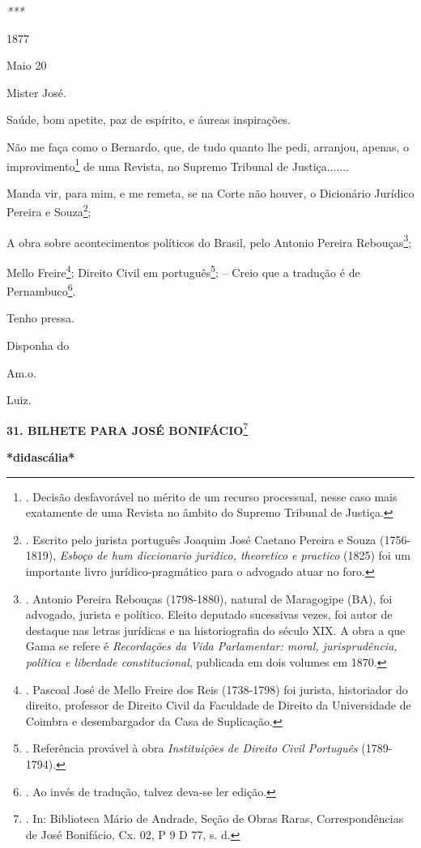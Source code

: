 \emph{***}

1877

Maio 20

Mister José.

Saúde, bom apetite, paz de espírito, e áureas inspirações.

Não me faça como o Bernardo, que, de tudo quanto lhe pedi, arranjou,
apenas, o improvimento\footnote{. Decisão desfavorável no mérito de um
  recurso processual, nesse caso mais exatamente de uma Revista no
  âmbito do Supremo Tribunal de Justiça.} de uma Revista, no Supremo
Tribunal de Justiça.......

Manda vir, para mim, e me remeta, se na Corte não houver, o Dicionário
Jurídico Pereira e Souza\footnote{. Escrito pelo jurista português
  Joaquim José Caetano Pereira e Souza (1756-1819), \emph{Esboço de hum
  diccionario juridico, theoretico e practico} (1825) foi um importante
  livro jurídico-pragmático para o advogado atuar no foro.};

A obra sobre acontecimentos políticos do Brasil, pelo Antonio Pereira
Rebouças\footnote{. Antonio Pereira Rebouças (1798-1880), natural de
  Maragogipe (BA), foi advogado, jurista e político. Eleito deputado
  sucessivas vezes, foi autor de destaque nas letras jurídicas e na
  historiografia do século XIX. A obra a que Gama se refere é
  \emph{Recordações da Vida Parlamentar: moral, jurisprudência, política
  e liberdade constitucional}, publicada em dois volumes em 1870.};

Mello Freire\footnote{. Pascoal José de Mello Freire dos Reis
  (1738-1798) foi jurista, historiador do direito, professor de Direito
  Civil da Faculdade de Direito da Universidade de Coimbra e
  desembargador da Casa de Suplicação.}; Direito Civil em
português\footnote{. Referência provável à obra \emph{Instituições de
  Direito Civil Português} (1789-1794).}; -- Creio que a tradução é de
Pernambuco\footnote{. Ao invés de tradução, talvez deva-se ler edição.}.

\protect\hypertarget{Secao_Sem_Titulo-43}{}{}Tenho pressa.

Disponha do

Am.o.

Luiz.

\textbf{31. BILHETE PARA JOSÉ BONIFÁCIO}\footnote{. In: Biblioteca Mário
  de Andrade, Seção de Obras Raras, Correspondências de José Bonifácio,
  Cx. 02, P 9 D 77, s. d.}

\textbf{*}\protect\hypertarget{Secao_Sem_Titulo-44}{}{}\textbf{didascália*}

